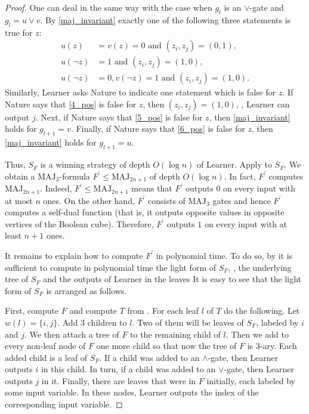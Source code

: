 \documentclass{toc}
\def\MAJ{\mathrm{MAJ}}
\begin{document}
\begin{proof}
One can deal in the same way with the case when $g_l$ is an $\lor$-gate and $g_l = u \lor v$. By \eqref{maj_invariant} exactly one of the following three statements is true for $z$:
\begin{align}
\label{4_pos}
u(z) &=   v(z) = 0 \mbox{ and } (z_i, z_j) = (0,1), \\
\label{5_pos}
u(\lnot z) &= 1 \mbox{ and } (z_i,z_j) = (1,0),\\
\label{6_pos}
u(\lnot z) &= 0,  v(\lnot z) = 1 \mbox{ and } (z_i,z_j) = (1,0).
\end{align}
Similarly, Learner asks Nature to indicate one statement which is false for $z$. If Nature says that \eqref{4_pos} is false for $z$, then $(z_i,z_j) = (1,0)$, \ie, Learner can output $j$. Next, if Nature says that \eqref{5_pos} is false for $z$, then   \eqref{maj_invariant} holds for $g_{l + 1} = v$. Finally, if Nature says that \eqref{6_pos} is false for $z$, then \eqref{maj_invariant} holds for $g_{l + 1} = u$.

Thus, $S_F$ is 
%
a winning strategy of depth $O(\log n)$  %
of Learner. Apply  to $S_F$. 
%
We obtain  %
%
%
a $\MAJ_3$-formula $F^\prime \le \MAJ_{2n + 1}$
of depth $O(\log n)$.  %
In fact, $F^\prime$ computes $\MAJ_{2n + 1}$. Indeed, $F^\prime \le \MAJ_{2n + 1}$ means that $F^\prime$ outputs $0$ on every input with at most $n$ ones. On the other hand, $F^\prime$ consists of $\MAJ_3$ gates and hence $F^\prime$ computes a self-dual function (that is, it outputs opposite values in opposite vertices of the Boolean cube). Therefore, $F^\prime$ outputs $1$ on every input with at least $n + 1$ ones.

It remains to explain how to  compute $F^\prime$ in polynomial time. To do so, by  it is sufficient to compute in polynomial time the light form of $S_F$, \ie, the underlying tree of $S_F$ and  the outputs of Learner in the %
leaves  %
%
It is easy to see that the light form of $S_F$ is arranged as follows.

First, compute $F$ and compute $T$ from . For each leaf $l$ of $T$ do the following. Let $w(l) = \{i, j\}$. Add $3$ children to $l$. Two of them will be leaves of $S_F$, labeled by $i$ and $j$. We then attach a tree of $F$ to the remaining child of $l$.   Then we add to every non-leaf node of $F$ one more child so that now the tree of $F$ is $3$-ary. Each added child is a leaf of $S_F$. If a child was added to an $\land$-gate, then Learner outputs $i$ in this child. In turn, if a child was added to an $\lor$-gate, then Learner outputs $j$ in it. Finally, there are leaves that were in $F$ initially, each labeled by some input variable. In these nodes, Learner outputs the index of the corresponding input variable.
\end{proof}
\end{document}
